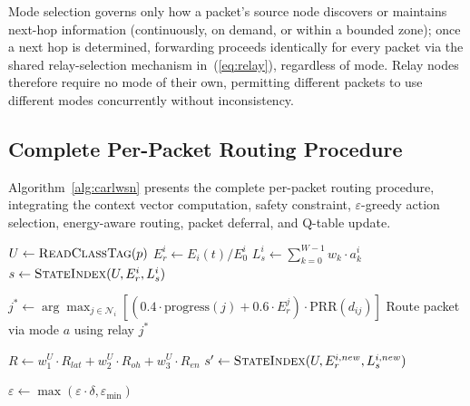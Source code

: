 \documentclass[12pt]{article}
\begin{document}
Mode selection governs only how a packet's source node discovers or
maintains next-hop information (continuously, on demand, or within
a bounded zone); once a next hop is determined, forwarding proceeds
identically for every packet via the shared relay-selection
mechanism in~(\ref{eq:relay}), regardless of mode. Relay nodes
therefore require no mode of their own, permitting different
packets to use different modes concurrently without inconsistency.

\subsection{Complete Per-Packet Routing Procedure}

Algorithm~\ref{alg:carlwsn} presents the complete per-packet routing
procedure, integrating the context vector computation, safety
constraint, $\varepsilon$-greedy action selection, energy-aware
routing, packet deferral, and Q-table update.

\begin{algorithm}[!t]
\caption{CARL-WSN Per-Packet Routing with Q-Learning}
\label{alg:carlwsn}
\SetAlgoLined
{}

$U \gets \textsc{ReadClassTag}(p)$\;
$E_r^i \gets E_i(t) / E_0^i$\;
$L_s^i \gets \sum_{k=0}^{W-1} w_k \cdot a_k^i$\;
$s \gets \textsc{StateIndex}(U, E_r^i, L_s^i)$\;


$j^* \gets \arg\max_{j \in \mathcal{N}_i} \left[ \left( 0.4 \cdot \mathrm{progress}(j) + 0.6 \cdot E_r^j \right) \cdot \mathrm{PRR}(d_{ij}) \right]$\;
Route packet via mode $a$ using relay $j^*$\;

$R \gets w_1^U \cdot R_{lat} + w_2^U \cdot R_{oh} + w_3^U \cdot R_{en}$\;
$s' \gets \textsc{StateIndex}(U, E_r^{i,new}, L_s^{i,new})$\;


$\varepsilon \gets \max(\varepsilon \cdot \delta, \varepsilon_{\min})$\;
\end{algorithm}
\end{document}

